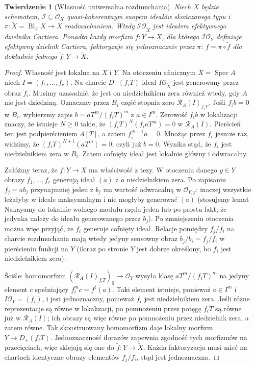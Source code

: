 \documentclass[11pt,a4paper,openany]{report}
\numberwithin{equation}{section}
\theoremstyle{plain}
\newtheorem{twierdzenie}{Twierdzenie}[section]
\theoremstyle{definition}
\theoremstyle{remark}
\newcommand{\Spec}{\operatorname{Spec}}
\begin{document}
\begin{twierdzenie}[Własność uniwersalna rozdmuchania]
\label{tw:ga5-universal}
Niech $X$ będzie schematem, $\mathcal I\subseteq\mathcal O_X$
quasi-koherentnym snopem ideałów skończonego typu i
$\pi:\widetilde X=\operatorname{Bl}_{\mathcal I}X\to X$
rozdmuchaniem. Wtedy $\mathcal I\mathcal O_{\widetilde X}$
jest ideałem efektywnego dzielnika Cartiera. Ponadto
każdy morfizm $f:Y\to X$, dla którego
$\mathcal I\mathcal O_Y$ definiuje efektywny dzielnik
Cartiera, faktoryzuje się \emph{jednoznacznie} przez $\pi$:
$ f=\pi\circ\widetilde f$ dla dokładnie jednego
$\widetilde f:Y\to\widetilde X$.
\end{twierdzenie}
\begin{proof}
Własność jest lokalna na $X$ i $Y$. Na otoczeniu
afinicznym $X=\Spec A$ niech $I=(f_1,\ldots,f_r)$.
Na charcie $D_+(f_iT)$ ideał $I\mathcal O_{\widetilde X}$
jest generowany przez obraz $f_i$. Musimy uzasadnić,
że jest on niedzielnikiem zera również wtedy, gdy $A$
nie jest dziedziną. Oznaczmy przez $B_i$ część stopnia
zero $\mathcal R_A(I)_{f_iT}$. Jeśli $f_i b=0$ w $B_i$,
wybierzmy zapis $b=aT^m/(f_iT)^m$ z $a\in I^m$.
Zerowość $f_i b$ w lokalizacji znaczy, że istnieje
$N\ge0$ takie, że $(f_iT)^N(f_i aT^m)=0$
w $\mathcal R_A(I)$. Pierścień ten jest podpierścieniem
$A[T]$, a zatem $f_i^{N+1}a=0$. Mnożąc przez $f_i$
jeszcze raz, widzimy, że $(f_iT)^{N+1}(aT^m)=0$;
czyli już $b=0$. Wynika stąd, że $f_i$ jest
niedzielnikiem zera w $B_i$. Zatem cofnięty ideał
jest lokalnie główny i odwracalny.

Załóżmy teraz, że $f:Y\to X$ ma właściwość z tezy.
W otoczeniu danego $y\in Y$ obrazy $f_1,\ldots,f_r$
generują ideał $(a)$ z $a$ niedzielnikiem zera.
Po zapisaniu $f_j=ab_j$ przynajmniej jeden z $b_j$
ma wartość odwracalną w $\mathcal O_{Y,y}$: inaczej
wszystkie leżałyby w ideale maksymalnym i nie mogłyby
generować $(a)$ (stosujemy lemat Nakayamy do lokalnie
wolnego modułu rzędu jeden lub po prostu fakt, że
jedynka należy do ideału generowanego przez $b_j$).
Po zmniejszeniu otoczenia można więc przyjąć, że
$f_i$ generuje cofnięty ideał. Relacje pomiędzy
$f_j/f_i$ na charcie rozdmuchania mają wtedy jedyny
sensowny obraz $b_j/b_i=f_j/f_i$ w pierścieniu
funkcji na $Y$ (iloraz po stronie $Y$ jest dobrze
określony, bo $f_i$ jest niedzielnikiem zera).

Ściśle: homomorfizm
$(\mathcal R_A(I)_{f_iT})_0\to\mathcal O_Y$
wysyła klasę $aT^m/(f_iT)^m$ na jedyny element
$c$ spełniający $f_i^m c=f^\sharp(a)$.
Taki element istnieje, ponieważ $a\in I^m$ i
$I\mathcal O_Y=(f_i)$, i jest jednoznaczny,
ponieważ $f_i$ jest niedzielnikiem zera.
Jeśli różne reprezentacje są równe w lokalizacji,
po pomnożeniu przez potęgę $f_iT$ są równe już w
$\mathcal R_A(I)$; ich obrazy są więc równe po
pomnożeniu przez niedzielnik zera, a zatem równe.
Tak skonstruowany homomorfizm daje lokalny morfizm
$Y\to D_+(f_iT)$. Jednoznaczność ilorazów zapewnia
zgodność tych morfizmów na przecięciach, więc
sklejają się one do $\widetilde f:Y\to\widetilde X$.
Każda faktoryzacja musi mieć na chartach identyczne
obrazy elementów $f_j/f_i$, stąd jest jednoznaczna.
\end{proof}
\end{document}
